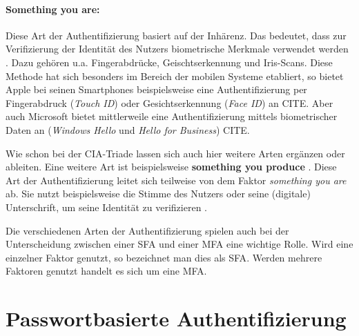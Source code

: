 \paragraph*{Something you are:}
Diese Art der Authentifizierung basiert auf der Inhärenz. Das bedeutet, dass zur Verifizierung der Identität des Nutzers biometrische Merkmale verwendet werden \cite{boonkrong2012security}. Dazu gehören u.a. Fingerabdrücke, Geischtserkennung und Iris-Scans. Diese Methode hat sich besonders im Bereich der mobilen Systeme etabliert, so bietet Apple bei seinen Smartphones beispielsweise eine Authentifizierung per Fingerabdruck (\textit{Touch ID}) oder Gesichtserkennung (\textit{Face ID}) an CITE. Aber auch Microsoft bietet mittlerweile eine Authentifizierung mittels biometrischer Daten an (\textit{Windows Hello} und \textit{Hello for Business}) CITE.

Wie schon bei der CIA-Triade lassen sich auch hier weitere Arten ergänzen oder ableiten. Eine weitere Art ist beispielsweise \textbf{something you produce} \cite{boonkrong2012security}. Diese Art der Authentifizierung leitet sich teilweise von dem Faktor \textit{something you are} ab. Sie nutzt beispielsweise die Stimme des Nutzers oder seine (digitale) Unterschrift, um seine Identität zu verifizieren \cite{boonkrong2012security}. 

Die verschiedenen Arten der Authentifizierung spielen auch bei der Unterscheidung zwischen einer \ac{SFA} und einer  \ac{MFA} eine wichtige Rolle. Wird eine einzelner Faktor genutzt, so bezeichnet man dies als \ac{SFA}. Werden mehrere Faktoren genutzt handelt es sich um eine \ac{MFA}.

\section{Passwortbasierte Authentifizierung}\label{pw-auth}

